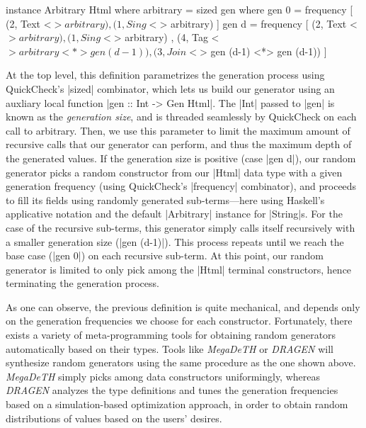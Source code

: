 \begin{code}
instance Arbitrary Html where
  arbitrary = sized gen
    where
      gen 0 = frequency
        [  (2,  Text    <$> arbitrary)
        ,  (1,  Sing    <$> arbitrary) ]
      gen d = frequency
        [  (2,  Text    <$> arbitrary)
        ,  (1,  Sing    <$> arbitrary)
        ,  (4,  Tag     <$> arbitrary  <*> gen (d-1))
        ,  (3,  Join    <$> gen (d-1)  <*> gen (d-1)) ]
\end{code} %

At the top level, this definition parametrizes the generation process using
QuickCheck's |sized| combinator, which lets us build our generator using an
auxliary local function |gen :: Int -> Gen Html|.
%
The |Int| passed to |gen| is known as the \emph{generation size}, and is
threaded seamlessly by QuickCheck on each call to arbitrary.
%
Then, we use this parameter to limit the maximum amount of recursive calls that
our generator can perform, and thus the maximum depth of the generated values.
%
If the generation size is positive (case |gen d|), our random generator picks a
random constructor from our |Html| data type with a given generation frequency
(using QuickCheck's |frequency| combinator), and proceeds to fill its fields
using randomly generated sub-terms---here using Haskell's applicative notation
and the default |Arbitrary| instance for |String|s.
%
For the case of the recursive sub-terms, this generator simply calls itself
recursively with a smaller generation size (|gen (d-1)|).
%
This process repeats until we reach the base case (|gen 0|) on each recursive
sub-term.
%
At this point, our random generator is limited to only pick among the |Html|
terminal constructors, hence terminating the generation process.


%
As one can observe, the previous definition is quite mechanical, and depends
only on the generation frequencies we choose for each constructor.
%
Fortunately, there exists a variety of meta-programming tools for obtaining
random generators automatically based on their types.
%
Tools like \emph{MegaDeTH} or \emph{DRAGEN} will synthesize random generators
using the same procedure as the one shown above.
%
\emph{MegaDeTH} simply picks among data constructors uniformingly, whereas
\emph{DRAGEN} analyzes the type definitions and tunes the generation frequencies
based on a simulation-based optimization approach, in order to obtain random
distributions of values based on the users' desires.


